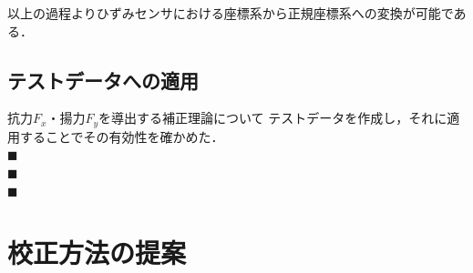 \documentclass[twocolumn,a4j]{jsarticle}
\begin{document}
以上の過程よりひずみセンサにおける座標系から正規座標系への変換が可能である．

\subsection{テストデータへの適用}

抗力$F_x$・揚力$F_y$を導出する補正理論について
テストデータを作成し，それに適用することでその有効性を確かめた．\\

$\blacksquare$ \\
$\blacksquare$ \\
$\blacksquare$ \\

\section{校正方法の提案}
\end{document}
